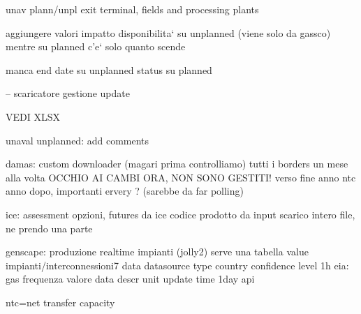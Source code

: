         unav plann/unpl exit terminal, fields and processing plants
        
        aggiungere valori impatto disponibilita` su unplanned (viene solo da gassco)
            mentre su planned c'e` solo quanto scende
            
            manca end date su unplanned
            status su planned\
            
        -- scaricatore gestione update
        
        VEDI XLSX
    
    unaval unplanned: add comments

    damas: custom downloader (magari prima controlliamo)
        tutti i borders
        un mese alla volta
            OCCHIO AI CAMBI ORA, NON SONO GESTITI!
        verso fine anno ntc anno dopo, importanti
        ervery ? (sarebbe da far polling)
    
    ice: assessment opzioni, futures da ice
        codice prodotto da input
            scarico intero file, ne prendo una parte
    
    genscape: produzione realtime impianti (jolly2)
        serve una tabella
            value
            impianti/interconnessioni7
            data
            datasource
            type
            country
            confidence level
        1h
    eia:
        gas
            frequenza
            valore
            data
            descr
            unit
            update time
        1day
        api
            
    
    
    ntc=net transfer capacity
    